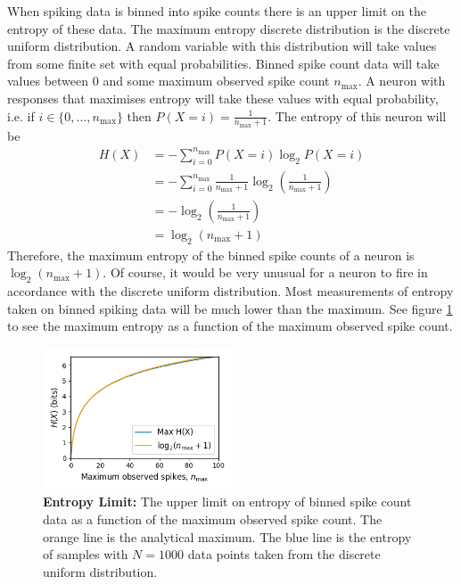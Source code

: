         When spiking data is binned into spike counts there is an upper limit on the entropy of these data. The maximum entropy discrete distribution is the discrete uniform distribution. A random variable with this distribution will take values from some finite set with equal probabilities. Binned spike count data will take values between $0$ and some maximum observed spike count $n_{\max}$. A neuron with responses that maximises entropy will take these values with equal probability, i.e. if $i \in \lbrace 0, \dots, n_{\max} \rbrace$ then $P(X = i) = \frac{1}{n_{\max} + 1}$. The entropy of this neuron will be
        \begin{align*}
          H(X)  &= - \sum_{i=0}^{n_{\max}} P(X = i) \log _2 P(X=i) \\
                &= - \sum_{i=0}^{n_{\max}} \frac{1}{n_{\max} + 1} \log_2 \left( \frac{1}{n_{\max} + 1} \right) \\
                &= - \log_2 \left( \frac{1}{n_{\max} + 1} \right) \\
                &= \log_2 \left( n_{\max} + 1 \right)
        \end{align*}
        Therefore, the maximum entropy of the binned spike counts of a neuron is $\log _2 \left( n_{\max} + 1 \right)$. Of course, it would be very unusual for a neuron to fire in accordance with the discrete uniform distribution. Most measurements of entropy taken on binned spiking data will be much lower than the maximum. See figure \ref{fig:entropy_limit} to see the maximum entropy as a function of the maximum observed spike count.

        \begin{figure}[h]
          \centering
          \includegraphics[width=0.5\textwidth]{figures/eight_probe/entropy_limit.png}
          \caption{\textbf{Entropy Limit:} The upper limit on entropy of binned spike count data as a function of the maximum observed spike count. The orange line is the analytical maximum. The blue line is the entropy of samples with $N=1000$ data points taken from the discrete uniform distribution.}
          \label{fig:entropy_limit}
        \end{figure}

